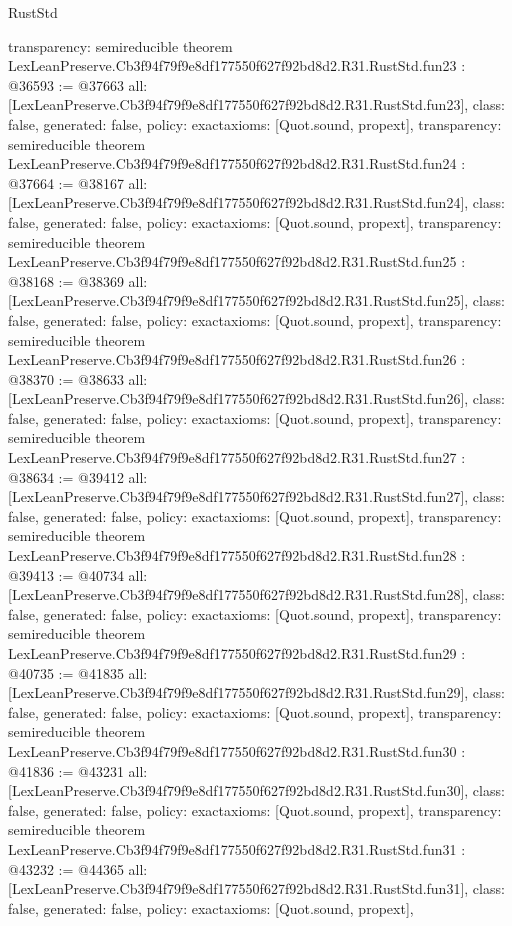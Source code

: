 \begin{lexlean}{RustStd}
\begin{coremodule}
{  transparency: semireducible
}
theorem LexLeanPreserve.Cb3f94f79f9e8df177550f627f92bd8d2.R31.RustStd.fun23 : @36593 := @37663 {
  all: [LexLeanPreserve.Cb3f94f79f9e8df177550f627f92bd8d2.R31.RustStd.fun23],
  class: false,
  generated: false,
  policy: exact{axioms: [Quot.sound, propext]},
  transparency: semireducible
}
theorem LexLeanPreserve.Cb3f94f79f9e8df177550f627f92bd8d2.R31.RustStd.fun24 : @37664 := @38167 {
  all: [LexLeanPreserve.Cb3f94f79f9e8df177550f627f92bd8d2.R31.RustStd.fun24],
  class: false,
  generated: false,
  policy: exact{axioms: [Quot.sound, propext]},
  transparency: semireducible
}
theorem LexLeanPreserve.Cb3f94f79f9e8df177550f627f92bd8d2.R31.RustStd.fun25 : @38168 := @38369 {
  all: [LexLeanPreserve.Cb3f94f79f9e8df177550f627f92bd8d2.R31.RustStd.fun25],
  class: false,
  generated: false,
  policy: exact{axioms: [Quot.sound, propext]},
  transparency: semireducible
}
theorem LexLeanPreserve.Cb3f94f79f9e8df177550f627f92bd8d2.R31.RustStd.fun26 : @38370 := @38633 {
  all: [LexLeanPreserve.Cb3f94f79f9e8df177550f627f92bd8d2.R31.RustStd.fun26],
  class: false,
  generated: false,
  policy: exact{axioms: [Quot.sound, propext]},
  transparency: semireducible
}
theorem LexLeanPreserve.Cb3f94f79f9e8df177550f627f92bd8d2.R31.RustStd.fun27 : @38634 := @39412 {
  all: [LexLeanPreserve.Cb3f94f79f9e8df177550f627f92bd8d2.R31.RustStd.fun27],
  class: false,
  generated: false,
  policy: exact{axioms: [Quot.sound, propext]},
  transparency: semireducible
}
theorem LexLeanPreserve.Cb3f94f79f9e8df177550f627f92bd8d2.R31.RustStd.fun28 : @39413 := @40734 {
  all: [LexLeanPreserve.Cb3f94f79f9e8df177550f627f92bd8d2.R31.RustStd.fun28],
  class: false,
  generated: false,
  policy: exact{axioms: [Quot.sound, propext]},
  transparency: semireducible
}
theorem LexLeanPreserve.Cb3f94f79f9e8df177550f627f92bd8d2.R31.RustStd.fun29 : @40735 := @41835 {
  all: [LexLeanPreserve.Cb3f94f79f9e8df177550f627f92bd8d2.R31.RustStd.fun29],
  class: false,
  generated: false,
  policy: exact{axioms: [Quot.sound, propext]},
  transparency: semireducible
}
theorem LexLeanPreserve.Cb3f94f79f9e8df177550f627f92bd8d2.R31.RustStd.fun30 : @41836 := @43231 {
  all: [LexLeanPreserve.Cb3f94f79f9e8df177550f627f92bd8d2.R31.RustStd.fun30],
  class: false,
  generated: false,
  policy: exact{axioms: [Quot.sound, propext]},
  transparency: semireducible
}
theorem LexLeanPreserve.Cb3f94f79f9e8df177550f627f92bd8d2.R31.RustStd.fun31 : @43232 := @44365 {
  all: [LexLeanPreserve.Cb3f94f79f9e8df177550f627f92bd8d2.R31.RustStd.fun31],
  class: false,
  generated: false,
  policy: exact{axioms: [Quot.sound, propext]},
}
\end{coremodule}
\end{lexlean}
